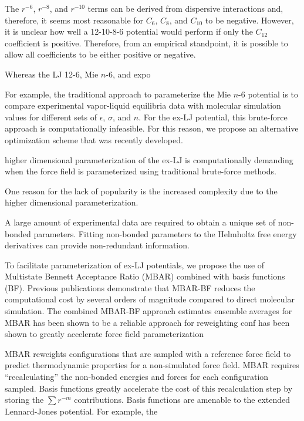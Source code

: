 \documentclass[11pt,a4paper]{article}
\begin{document}
The $r^{-6}$, $r^{-8}$, and $r^{-10}$ terms can be derived from dispersive interactions and, therefore, it seems most reasonable for $C_6$, $C_8$, and $C_{10}$ to be negative. However, it is unclear how well a 12-10-8-6 potential would perform if only the $C_{12}$ coefficient is positive. Therefore, from an empirical standpoint, it is possible to allow all coefficients to be either positive or negative.

Whereas the LJ 12-6, Mie $n$-6, and expo

For example, the traditional approach to parameterize the Mie $n$-6 potential is to compare experimental vapor-liquid equilibria data with molecular simulation values for different sets of $\epsilon$, $\sigma$, and $n$. For the ex-LJ potential, this brute-force approach is computationally infeasible. For this reason, we propose an alternative optimization scheme that was recently developed.

higher dimensional parameterization of the ex-LJ is computationally demanding when the force field is parameterized using traditional brute-force methods.

One reason for the lack of popularity is the increased complexity due to the higher dimensional parameterization.

A large amount of experimental data are required to obtain a unique set of non-bonded parameters. Fitting non-bonded parameters to the Helmholtz free energy derivatives can provide non-redundant information.



To facilitate parameterization of ex-LJ potentials, we propose the use of Multistate Bennett Acceptance Ratio (MBAR) combined with basis functions (BF). Previous publications demonstrate that MBAR-BF reduces the computational cost by several orders of magnitude compared to direct molecular simulation. The combined MBAR-BF approach estimates ensemble averages for   MBAR has been shown to be a reliable approach for reweighting conf has been shown to greatly accelerate force field parameterization

MBAR reweights configurations that are sampled with a reference force field to predict thermodynamic properties for a non-simulated force field. MBAR requires ``recalculating'' the non-bonded energies and forces for each configuration sampled. Basis functions greatly accelerate the cost of this recalculation step by storing the $\sum r^{-m}$ contributions. Basis functions are amenable to the extended Lennard-Jones potential. For example, the 
\end{document}
